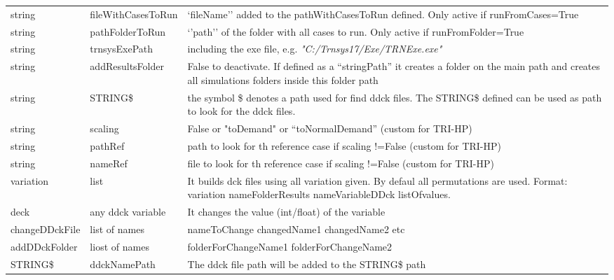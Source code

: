 \documentclass[english]{SPFReport}
\begin{document}
\begin{tabular}{| p{25mm} |  p{35mm} | p{90mm}  |}
string & fileWithCasesToRun & `fileName'' added to the pathWithCasesToRun defined. Only active if runFromCases=True \\
string & pathFolderToRun & `'path'' of the folder with all cases to run. Only active if runFromFolder=True \\
 string & trnsysExePath & including the exe file, e.g. \textit{"C:/Trnsys17/Exe/TRNExe.exe"} \\
 string & addResultsFolder & False to deactivate. If defined as a ``stringPath'' it creates a folder on the main path and creates all simulations folders inside this folder path\\
  string & STRING\$ & the symbol \$ denotes a path used for find ddck files. The STRING\$ defined can be used as path to look for the ddck files.\\
 string & scaling & False or "toDemand" or ``toNormalDemand'' (custom for TRI-HP) \\
string &pathRef & path to look for th reference case if scaling !=False (custom for TRI-HP)  \\
string &nameRef & file to look for th reference case if scaling !=False  (custom for TRI-HP) \\

  variation & list & It builds dck files using all variation given.  By defaul all permutations are used. Format: variation nameFolderResults nameVariableDDck listOfvalues.\\
    deck & any ddck variable & It changes the value (int/float) of the variable \\
    
changeDDckFile & list of names &  nameToChange changedName1 changedName2 etc \\
addDDckFolder & liost of names &  folderForChangeName1 folderForChangeName2 \\

   STRING\$ & ddckNamePath & The ddck file path will be added to the STRING\$ path \\   
\hline
\end{tabular}
\end{document}
